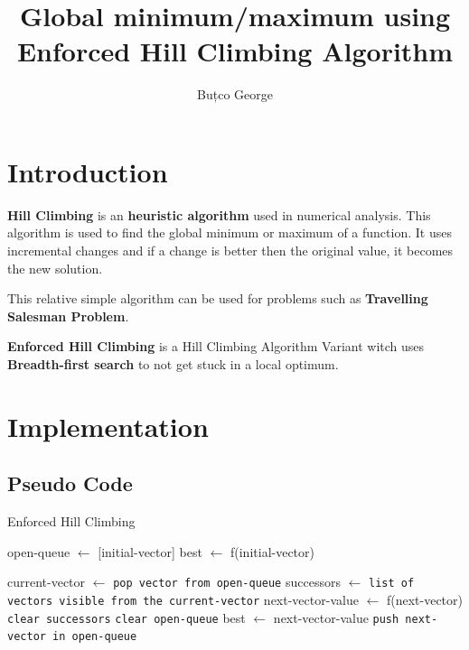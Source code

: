\documentclass{article}
\title{Global minimum/maximum using Enforced Hill Climbing Algorithm}
\author{Buțco George}
\date{}
\newcommand{\mediumSpace}{\vspace{0.5cm}}
\begin{document}
\maketitle

\section{Introduction}

\textbf{Hill Climbing} is an \textbf{heuristic algorithm} used in numerical analysis. This algorithm is used to find the global minimum or maximum of a function. It uses incremental changes and if a change is better then the original value, it becomes the new solution.

This relative simple algorithm can be used for problems such as \textbf{Travelling Salesman Problem}.

\mediumSpace

\textbf{Enforced Hill Climbing} is a Hill Climbing Algorithm Variant witch uses \textbf{Breadth-first search} to not get stuck in a local optimum.

\section{Implementation}

\subsection{Pseudo Code}

\begin{algorithm}
\caption{Enforced Hill Climbing}\label{alg:cap}
\begin{algorithmic}
\State open-queue $ \gets $ [initial-vector]
\State best $ \gets $ f(initial-vector)


    \State current-vector $ \gets $ \texttt{pop vector from open-queue}
    \State successors $ \gets $ \texttt{list of vectors visible from the current-vector}
        \State next-vector-value $ \gets $ f(next-vector)
            \State \texttt{clear successors}
            \State \texttt{clear open-queue}
            \State best $\gets$ next-vector-value
        \EndIf
        \State \texttt{push next-vector in open-queue}
    \EndFor
    
\EndWhile
\end{algorithmic}
\end{algorithm}
\end{document}
